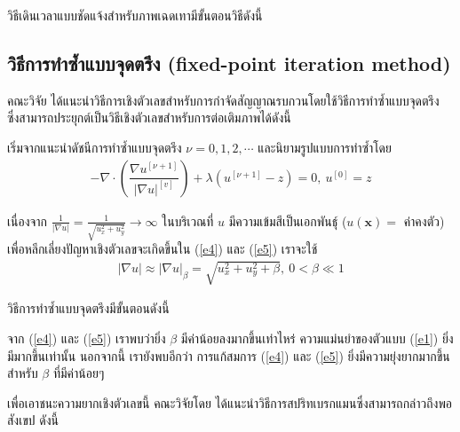  \vspace{0.5cm} \hspace{0.5cm}วิธีเดินเวลาแบบชัดแจ้งสำหรับภาพเฉดเทามีขั้นตอนวิธีดังนี้  \\
 



\subsection{วิธีการทำซ้ำแบบจุดตรึง (fixed-point iteration method) }

\hspace{1cm} คณะวิจัย \cite{ref:FixpointSolver} ได้แนะนำวิธีการเชิงตัวเลขสำหรับการกำจัดสัญญาณรบกวนโดยใช้วิธีการทำซ้ำแบบจุดตรึง ซึ่งสามารถประยุกต์เป็นวิธีเชิงตัวเลขสำหรับการต่อเติมภาพได้ดังนี้
	
\hspace{1cm} เริ่มจากแนะนำดัชนีการทำซ้ำแบบจุดตรึง $\nu=0,1,2,\cdots$ และนิยามรูปแบบการทำซ้ำโดย
\begin{align}
	- \nabla\cdot\left(\dfrac{\nabla u^{[\nu+1]}}{{| \nabla u |}^{[v]} }\right) + \lambda(u^{[\nu+1]}-z)  = 0,\ u^{[0]}=z
	\label{e5}
\end{align}

\hspace{1cm} เนื่องจาก $\tfrac{1}{| \nabla u |}=\tfrac{1}{\sqrt{u_x^2+u_y^2}} \rightarrow \infty$ ในบริเวณที่ $u$ มีความเข้มสีเป็นเอกพันธ์ุ ($u(\mathbf{x})=$ ค่าคงตัว) เพื่อหลีกเลี่ยงปัญหาเชิงตัวเลขจะเกิดขึ้นใน (\ref{e4}) และ (\ref{e5}) เราจะใช้ 
\begin{align*}
|\nabla u| \approx| \nabla u |_\beta=\sqrt{u_x^2+u_y^2+\beta},\ 0< \beta \ll 1
 \end{align*}

\hspace{1cm}วิธีการทำซ้ำแบบจุดตรึงมีขั้นตอนดังนี้ \\
\vspace{0.5cm} 

\vspace{0.5cm}
\hspace{1cm} จาก (\ref{e4}) และ (\ref{e5}) เราพบว่ายิ่ง $\beta$ มีค่าน้อยลงมากขึ้นเท่าไหร่ ความแม่นยำของตัวแบบ (\ref{e1}) ยิ่งมีมากขึ้นเท่านั้น นอกจากนี้ เรายังพบอีกว่า การแก้สมการ (\ref{e4}) และ (\ref{e5}) ยิ่งมีความยุ่งยากมากขึ้นสำหรับ $\beta$ ที่มีค่าน้อยๆ 

\hspace{1cm} เพื่อเอาชนะความยากเชิงตัวเลขนี้ คณะวิจัยโดย \cite{ref:splitbergman-inpaint} ได้แนะนำวิธีการสปริทเบรกแมนซึ่งสามารถกล่าวถึงพอสังเขป ดังนี้

